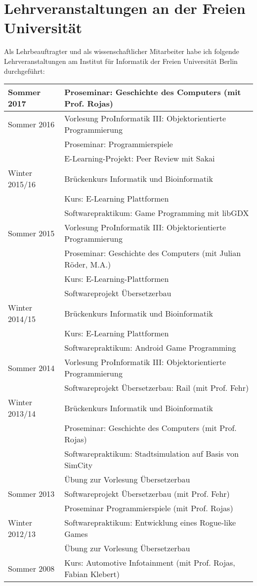 \documentclass[11pt,ngerman]{article}
\begin{document}
\pagebreak

\section{Lehrveranstaltungen an der Freien Universität}

Als Lehrbeauftragter und als wissenschaftlicher Mitarbeiter habe ich folgende Lehrveranstaltungen am Institut für Informatik der Freien Universität Berlin durchgeführt:\\

\begin{tabular}{ l | l }
  Sommer 2017 & Proseminar: Geschichte des Computers (mit Prof. Rojas)\\
  \hline
  Sommer 2016 & Vorlesung ProInformatik III: Objektorientierte Programmierung\\[-2mm]
  & Proseminar: Programmierspiele\\[-2mm]
  & E-Learning-Projekt: Peer Review mit Sakai\\
  \hline  
Winter 2015/16 & Brückenkurs Informatik und Bioinformatik\\[-2mm]
& Kurs: E-Learning Plattformen\\[-2mm]
& Softwarepraktikum: Game Programming mit libGDX\\
 \hline			
Sommer 2015 & Vorlesung ProInformatik III: Objektorientierte Programmierung\\[-2mm]
& Proseminar: Geschichte des Computers (mit Julian Röder, M.A.)\\[-2mm]
& Kurs: E-Learning-Plattformen\\[-2mm]
& Softwareprojekt Übersetzerbau\\
  \hline
Winter 2014/15 & Brückenkurs Informatik und Bioinformatik\\[-2mm]
& Kurs: E-Learning Plattformen\\[-2mm]
& Softwarepraktikum: Android Game Programming\\
  \hline
Sommer 2014 & Vorlesung ProInformatik III: Objektorientierte Programmierung\\[-2mm]
& Softwareprojekt Übersetzerbau: Rail (mit Prof. Fehr)\\
  \hline
Winter 2013/14 & Brückenkurs Informatik und Bioinformatik\\[-2mm]
& Proseminar: Geschichte des Computers (mit Prof. Rojas)\\[-2mm]
& Softwarepraktikum: Stadtsimulation auf Basis von SimCity\\[-2mm]
& Übung zur Vorlesung Übersetzerbau\\
  \hline
Sommer 2013 & Softwareprojekt Übersetzerbau (mit Prof. Fehr)\\[-2mm]
& Proseminar Programmierspiele (mit Prof. Rojas)\\
  \hline
Winter 2012/13 & Softwarepraktikum: Entwicklung eines Rogue-like Games\\[-2mm]
& Übung zur Vorlesung Übersetzerbau\\
  \hline
Sommer 2008 & Kurs: Automotive Infotainment (mit Prof. Rojas, Fabian Klebert)\\
\end{tabular}
\end{document}
